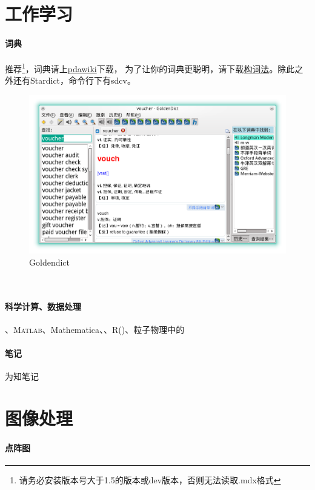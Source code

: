 \section{工作学习}
\paragraph{词典} 推荐\footnote{请务必安装版本号大于1.5的版本或dev版本，否则无法读取.mdx格式}，词典请上\href{http://pdawiki.com/forum/forum.php}{pdawiki}下载，
为了让你的词典更聪明，请下载\href{https://zpj.blog.ustc.edu.cn/wp-content/uploads/2014/02/wordsrule.tar.gz}{构词法}。除此之外还有Stardict，命令行下有sdcv。

\begin{figure}[htbp!]
\centering
\includegraphics[width=\textwidth]{./pic/goldendict.png} 
\caption{Goldendict}\label{goldendict}
\end{figure}
\
\paragraph{科学计算、数据处理}、\textsc{Matlab}、Mathematica、、R()、粒子物理中的

\paragraph{笔记} 为知笔记
\section{图像处理}
\paragraph{点阵图}

